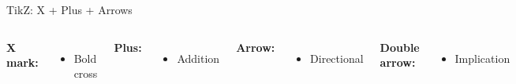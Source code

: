\documentclass[10pt]{beamer}
\begin{document}
\begin{frame}{TikZ: X + Plus + Arrows}
\begin{columns}
\textbf{X mark:}
\begin{itemize}
  \item Bold cross
\end{itemize}

\textbf{Plus:}
\begin{itemize}
  \item Addition
\end{itemize}

\textbf{Arrow:}
\begin{itemize}
  \item Directional
\end{itemize}

\textbf{Double arrow:}
\begin{itemize}
  \item Implication
\end{itemize}
\end{columns}
\end{frame}
\end{document}
